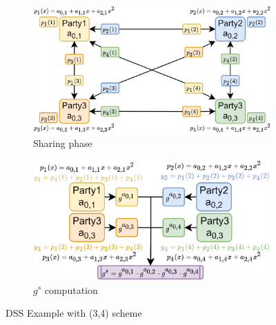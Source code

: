 \begin{figure}[H]
\vspace{-10pt}
    \centering
    \begin{subfigure}[b]{0.48\textwidth}
    \includegraphics[width=\textwidth]{image/secret_sharing/dssa.png}
    \caption{Sharing phase}
    \label{fig:dssa}
    \end{subfigure}\quad
    \begin{subfigure}[b]{0.48\textwidth}
    \includegraphics[width=\textwidth]{image/secret_sharing/dssb.png}
    \caption{$g^s$ computation}
    \label{fig:dssb}
    \end{subfigure}
    \caption{DSS Example with (3,4) scheme}
\end{figure}
